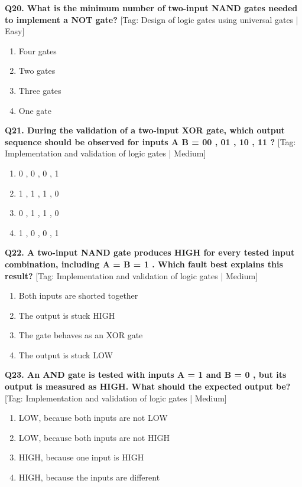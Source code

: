 \noindent\textbf{Q20. What is the minimum number of two-input NAND gates needed to implement a NOT gate?} \hfill [Tag: Design of logic gates using universal gates | Easy]
\begin{enumerate}[label=(\alph*),topsep=2pt,itemsep=1pt,partopsep=0pt,parsep=0pt]
    \item {Four gates}
    \item {Two gates}
    \item {Three gates}
    \item {One gate}
\end{enumerate}
\vspace{2mm}

\noindent\textbf{Q21. During the validation of a two-input XOR gate, which output sequence should be observed for inputs A B = 00 , 01 , 10 , 11 ?} \hfill [Tag: Implementation and validation of logic gates | Medium]
\begin{enumerate}[label=(\alph*),topsep=2pt,itemsep=1pt,partopsep=0pt,parsep=0pt]
    \item {0 , 0 , 0 , 1}
    \item {1 , 1 , 1 , 0}
    \item {0 , 1 , 1 , 0}
    \item {1 , 0 , 0 , 1}
\end{enumerate}
\vspace{2mm}

\noindent\textbf{Q22. A two-input NAND gate produces HIGH for every tested input combination, including A = B = 1 . Which fault best explains this result?} \hfill [Tag: Implementation and validation of logic gates | Medium]
\begin{enumerate}[label=(\alph*),topsep=2pt,itemsep=1pt,partopsep=0pt,parsep=0pt]
    \item {Both inputs are shorted together}
    \item {The output is stuck HIGH}
    \item {The gate behaves as an XOR gate}
    \item {The output is stuck LOW}
\end{enumerate}
\vspace{2mm}

\noindent\textbf{Q23. An AND gate is tested with inputs A = 1 and B = 0 , but its output is measured as HIGH. What should the expected output be?} \hfill [Tag: Implementation and validation of logic gates | Medium]
\begin{enumerate}[label=(\alph*),topsep=2pt,itemsep=1pt,partopsep=0pt,parsep=0pt]
    \item {LOW, because both inputs are not LOW}
    \item {LOW, because both inputs are not HIGH}
    \item {HIGH, because one input is HIGH}
    \item {HIGH, because the inputs are different}
\end{enumerate}
\vspace{2mm}


